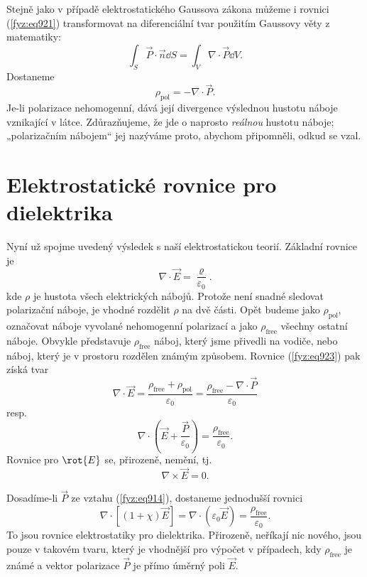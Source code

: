     Stejně jako v případě elektrostatického Gaussova zákona můžeme i rovnici (\ref{fyz:eq921})
    transformovat na diferenciální tvar použitím Gaussovy věty z matematiky:
    \begin{equation*}
      \int_S\vec{P}\cdot\vec{n}\dd{S}=\int_V∇\cdot\vec{P}\dd{V}.
    \end{equation*}
    Dostaneme
    \begin{equation}\label{fyz:eq922}
      ρ_{\text{pol}}=−∇⋅\vec{P}.
    \end{equation}
    Je-li polarizace nehomogenní, dává její divergence výslednou hustotu náboje vznikající v látce.
    Zdůrazňujeme, že jde o naprosto \emph{reálnou} hustotu náboje; „polarizačním nábojem“ jej
    nazýváme proto, abychom připomněli, odkud se vzal.

  \section{Elektrostatické rovnice pro dielektrika}\label{fyz:IIchapXsecIV}
    Nyní už spojme uvedený výsledek s naší elektrostatickou teorií. Základní rovnice je
    \begin{equation}\label{fyz:eq936}
      ∇\cdot\vec{E}=\dfrac{\varrho}{\varepsilon_0}.
    \end{equation}
    kde \(ρ\) je hustota všech elektrických nábojů. Protože není snadné sledovat polarizační náboje,
    je vhodné rozdělit \(ρ\) na dvě části. Opět budeme jako \(ρ_{\text{pol}}\), označovat náboje
    vyvolané nehomogenní polarizací a jako \(ρ_{\text{free}}\) všechny ostatní náboje. Obvykle
    představuje \(ρ_{\text{free}}\) náboj, který jsme přivedli na vodiče, nebo náboj, který je v
    prostoru rozdělen známým způsobem. Rovnice (\ref{fyz:eq923}) pak získá tvar
    \begin{equation*}
      ∇⋅\vec{E}=\dfrac{ρ_{\text{free}}+ρ_{\text{pol}}}{\varepsilon_0}
               =\dfrac{ρ_{\text{free}}−∇⋅\vec{P}}{\varepsilon_0}
    \end{equation*}
    resp. 
    \begin{equation}\label{fyz:eq923}
      ∇\cdot\left(\vec{E}+\dfrac{\vec{P}}{\varepsilon_0}\right)
        =\dfrac{ρ_{\text{free}}}{\varepsilon_0}.
    \end{equation}
    Rovnice pro \(\rot{E}\) se, přirozeně, nemění, tj.
    \begin{equation}\label{fyz:eq924}
      ∇×\vec{E}=0.
    \end{equation}

    Dosadíme-li \(\vec{P}\) ze vztahu (\ref{fyz:eq914}), dostaneme jednodušší rovnici
    \begin{equation}\label{fyz:eq925}
      ∇\cdot[(1+χ)\vec{E}]=∇⋅(\varepsilon_0\vec{E})=\dfrac{ρ_{\text{free}}}{\varepsilon_0}.
    \end{equation}
    To jsou rovnice elektrostatiky pro dielektrika. Přirozeně, neříkají nic nového, jsou pouze v
    takovém tvaru, který je vhodnější pro výpočet v případech, kdy \(ρ_{\text{free}}\) je známé a
    vektor polarizace \(\vec{P}\) je přímo úměrný poli \(\vec{E}\).

